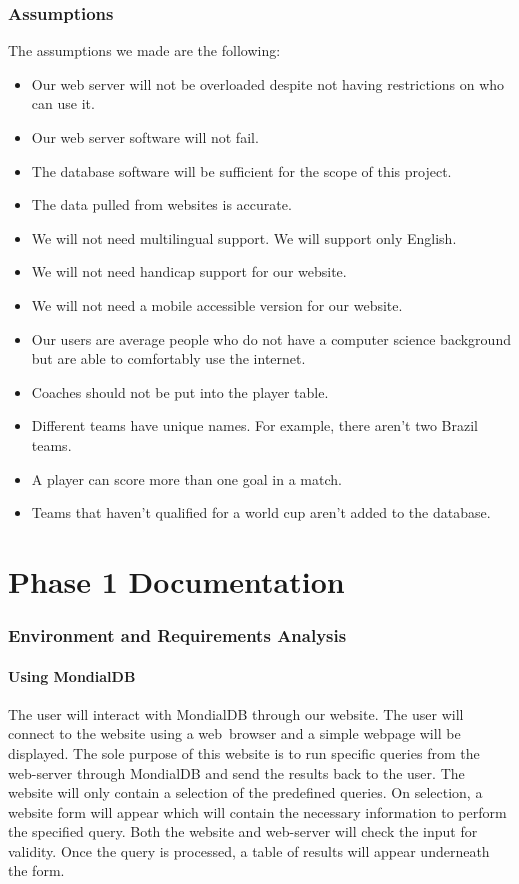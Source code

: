 \documentclass{article}
\begin{document}
\section{Assumptions}
The assumptions we made are the following:
\begin{itemize}
\item Our web server will not be overloaded despite not having restrictions on who can use it.
\item Our web server software will not fail.
\item The database software will be sufficient for the scope of this project.
\item The data pulled from websites is accurate.
\item We will not need multilingual support. We will support only English.
\item We will not need handicap support for our website.
\item We will not need a mobile accessible version for our website.
\item Our users are average people who do not have a computer science background but are able to comfortably use the internet.
\item Coaches should not be put into the player table.
\item Different teams have unique names. For example, there aren't two Brazil teams.
\item A player can score more than one goal in a match.
\item Teams that haven't qualified for a world cup aren't added to the database.
\end{itemize}

\part{Phase 1 Documentation}
\section{Environment and Requirements Analysis}

\subsection{Using MondialDB}
The user will interact with MondialDB through our website. The user will connect to the website using a web~browser and a simple webpage will be displayed. The sole purpose of this website is to run specific queries from the web-server through MondialDB and send the results back to the user. The website will only contain a selection of the predefined queries. On selection, a website form will appear which will contain the necessary information to perform the specified query. Both the website and web-server will check the input for validity. Once the query is processed, a table of results will appear underneath the form.
\end{document}
